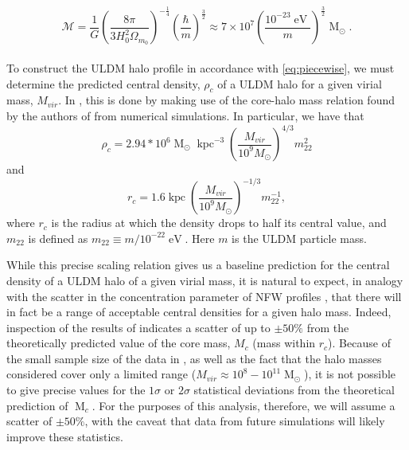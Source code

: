 \documentclass[a4paper,11pt]{article}
\begin{document}
\begin{equation}\label{eq:mass}
    \mathcal{M}=\frac{1}{G}\left(\frac{8\pi}{3 H_0^2\Omega_{m_0}}\right)^{-\frac{1}{4}}\left(\frac{\hbar}{m}\right)^{\frac{3}{2}}\approx 7\times 10^7\left(\frac{10^{-23}\operatorname{eV}}{m}\right)^{\frac{3}{2}}\operatorname{M}_{\odot}.
\end{equation}
\\

To construct the ULDM halo profile in accordance with \ref{eq:piecewise}, we must determine the predicted central density, $\rho_c$ of a ULDM halo for a given virial mass, $M_{vir}$. In \cite{Robles:2018fur}, this is done by making use of the core-halo mass relation found by the authors of \cite{Schive:2014hza} from numerical simulations. In particular, we have that 
\begin{equation}
    \rho_c = 2.94*10^6 \operatorname{M}_{\odot}\operatorname{kpc}^{-3}\left(\frac{M_{vir}}{10^9 M_{\odot}}\right)^{4/3}m_{22}^{2}
\end{equation}
and 
\begin{equation}
    r_c = 1.6 \operatorname{kpc}\left(\frac{M_{vir}}{10^9 M_{\odot}}\right)^{-1/3}m_{22}^{-1},
\end{equation}
where $r_c$ is the radius at which the density drops to half its central value, and $m_{22}$ is defined as $m_{22} \equiv m / 10^{-22} \operatorname{eV}$. Here $m$ is the ULDM particle mass. 

While this precise scaling relation gives us a baseline prediction for the central density of a ULDM halo of a given virial mass, it is natural to expect, in analogy with the scatter in the concentration parameter of NFW profiles \cite{Maccio:2008pcd}, that there will in fact be a range of acceptable central densities for a given halo  mass. Indeed, inspection of the results of \cite{Schive:2014hza} indicates a scatter of up to $\pm 50\%$ from the theoretically predicted value of the core mass, $M_c$ (mass within $r_c$). Because of the small sample size of the data in \cite{Schive:2014hza}, as well as the fact that the halo masses considered cover only a limited range ($ M_{vir} \approx 10^8-10^{11} \operatorname{M}_{\odot}$), it is not possible to give precise values for the $1\sigma$  or $2 \sigma$ statistical deviations from the theoretical prediction of  $\operatorname{M}_c$. For the purposes of this analysis, therefore,  we will assume a scatter of $\pm 50\%$, with the caveat that data from future simulations will likely improve these statistics.
\end{document}
